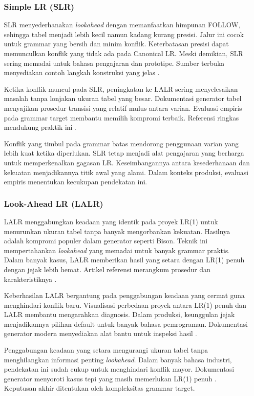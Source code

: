 \documentclass[../main.tex]{subfiles}
\begin{document}
\subsubsection{Simple LR (SLR)}
SLR menyederhanakan \emph{lookahead} dengan memanfaatkan himpunan FOLLOW, sehingga tabel menjadi lebih kecil namun kadang kurang presisi. Jalur ini cocok untuk grammar yang bersih dan minim konflik. Keterbatasan presisi dapat memunculkan konflik yang tidak ada pada Canonical LR. Meski demikian, SLR sering memadai untuk bahasa pengajaran dan prototipe. Sumber terbuka menyediakan contoh langkah konstruksi yang jelas \citep{WikiSLR}.

Ketika konflik muncul pada SLR, peningkatan ke LALR sering menyelesaikan masalah tanpa lonjakan ukuran tabel yang besar. Dokumentasi generator tabel menyajikan prosedur transisi yang relatif mulus antara varian. Evaluasi empiris pada grammar target membantu memilih kompromi terbaik. Referensi ringkas mendukung praktik ini \citep{WikiSLR}.

Konflik yang timbul pada grammar batas mendorong penggunaan varian yang lebih kuat ketika diperlukan. SLR tetap menjadi alat pengajaran yang berharga untuk memperkenalkan gagasan LR. Keseimbangannya antara kesederhanaan dan kekuatan menjadikannya titik awal yang alami. Dalam konteks produksi, evaluasi empiris menentukan kecukupan pendekatan ini.

\subsubsection{Look-Ahead LR (LALR)}
LALR menggabungkan keadaan yang identik pada proyek LR(1) untuk menurunkan ukuran tabel tanpa banyak mengorbankan kekuatan. Hasilnya adalah kompromi populer dalam generator seperti Bison. Teknik ini mempertahankan \emph{lookahead} yang memadai untuk banyak grammar praktis. Dalam banyak kasus, LALR memberikan hasil yang setara dengan LR(1) penuh dengan jejak lebih hemat. Artikel referensi merangkum prosedur dan karakteristiknya \citep{WikiLALR}.

Keberhasilan LALR bergantung pada penggabungan keadaan yang cermat guna menghindari konflik baru. Visualisasi perbedaan proyek antara LR(1) penuh dan LALR membantu mengarahkan diagnosis. Dalam produksi, keunggulan jejak menjadikannya pilihan default untuk banyak bahasa pemrograman. Dokumentasi generator modern menyediakan alat bantu untuk inspeksi hasil \citep{BisonManual}.

Penggabungan keadaan yang setara mengurangi ukuran tabel tanpa menghilangkan informasi penting \emph{lookahead}. Dalam banyak bahasa industri, pendekatan ini sudah cukup untuk menghindari konflik mayor. Dokumentasi generator menyoroti kasus tepi yang masih memerlukan LR(1) penuh \citep{WikiLALR}. Keputusan akhir ditentukan oleh kompleksitas grammar target.
\end{document}
